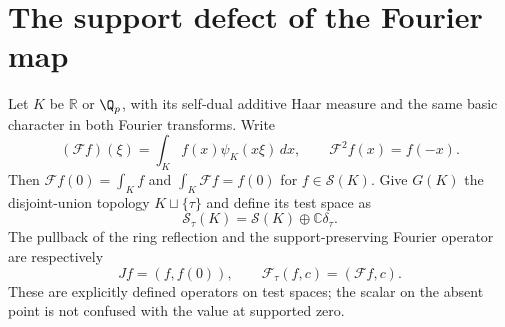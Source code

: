 \documentclass[11pt,a4paper]{article}
\theoremstyle{definition}\newtheorem{definition}[theorem]{Definition}
\newcommand{\C}{\mathbb C}\newcommand{\R}{\mathbb R}
\newcommand{\Sch}{\mathcal S}\newcommand{\im}{\operatorname{im}}
\begin{document}
\section{The support defect of the Fourier map}
\label{sec:fourier-support}
Let $K$ be $\R$ or $\Q_p$, with its self-dual additive Haar measure and the same basic character in both Fourier transforms. Write
\[
 (\mathcal F f)(\xi)=\int_K f(x)\psi_K(x\xi)\,dx,
 \qquad \mathcal F^2 f(x)=f(-x).
\]
Then $\mathcal Ff(0)=\int_Kf$ and $\int_K\mathcal Ff=f(0)$ for $f\in\Sch(K)$.
Give $G(K)$ the disjoint-union topology $K\sqcup\{\tau\}$ and define its test space as
\[
 \Sch_\tau(K)=\Sch(K)\oplus\C\delta_\tau.
\]
The pullback of the ring reflection and the support-preserving Fourier operator are respectively
\[
 Jf=(f,f(0)),\qquad \mathcal F_\tau(f,c)=(\mathcal Ff,c).
\]
These are explicitly defined operators on test spaces; the scalar on the absent point is not confused with the value at supported zero.
\end{document}
